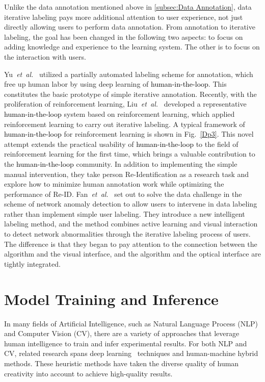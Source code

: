 \documentclass{article}
\newcommand\etal{\emph{et~al.}}
\newcommand{\REO}[1]{\textcolor{black}{#1}}
\begin{document}
Unlike the data annotation mentioned above in \ref{subsec:Data Annotation}, data iterative labeling pays more additional attention to user experience, not just directly allowing users to perform data annotation.
From annotation to iterative labeling, the goal has been changed in the following two aspects: to focus on adding knowledge and experience to the learning system. The other is to focus on the interaction with users.

Yu~\etal~\cite{yu2015lsun} utilized a partially automated labeling scheme for annotation, which free up human labor by using deep learning of \REO{human-in-the-loop}.
This constitutes the basic prototype of simple iterative annotation.
Recently, with the proliferation of reinforcement learning, Liu~\etal~\cite{liu2019deep} developed a representative \REO{human-in-the-loop} system based on reinforcement learning, which applied reinforcement learning to carry out iterative labeling. A typical framework of \REO{human-in-the-loop} for reinforcement learning is shown in Fig.~\ref{Dp3}. This novel attempt extends the practical usability of \REO{human-in-the-loop} to the field of reinforcement learning for the first time, which brings a valuable contribution to the \REO{human-in-the-loop} community.
In addition to implementing the simple manual intervention, they take person Re-Identification as a research task and explore how to minimize human annotation work while optimizing the performance of Re-ID. Fan~\etal~\cite{fan2019interactive} set out to solve the data challenge in the scheme of network anomaly detection to allow users to intervene in data labeling rather than implement simple user labeling.
They introduce a new intelligent labeling method, and the method combines active learning and visual interaction to detect network abnormalities through the iterative labeling process of users.
The difference is that they began to pay attention to the connection between the algorithm and the visual interface, and the algorithm and the optical interface are tightly integrated.



\section{Model Training and Inference}
\label{sec:MTI}
In many fields of Artificial Intelligence, such as Natural Language Process (NLP) and Computer Vision (CV), there are a variety of approaches that leverage human intelligence to train and infer experimental results.
For both NLP and CV, related research spans deep learning~\cite{lecun2015deep} techniques and human-machine hybrid methods.
These heuristic methods have taken the diverse quality of human creativity into account to achieve high-quality results.
\end{document}
